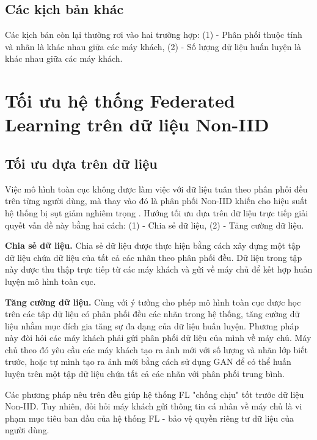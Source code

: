 \subsection{Các kịch bản khác}

Các kịch bản còn lại thường rơi vào hai trường hợp: (1) - Phân phối thuộc tính và nhãn là khác nhau giữa các máy khách, (2) - Số lượng dữ liệu huấn luyện là khác nhau giữa các máy khách.

\section{Tối ưu hệ thống Federated Learning trên dữ liệu Non-IID}

\subsection{Tối ưu dựa trên dữ liệu}

Việc mô hình toàn cục không được làm việc với dữ liệu tuân theo phân phối đều trên từng người dùng, mà thay vào đó là phân phối Non-IID khiến cho hiệu suất hệ thống bị sụt giảm nghiêm trọng \cite{zhao2018federated}. Hướng tối ưu dựa trên dữ liệu trực tiếp giải quyết vấn đề này bằng hai cách: (1) - Chia sẻ dữ liệu, (2) - Tăng cường dữ liệu.

\textbf{Chia sẻ dữ liệu.} Chia sẻ dữ liệu \cite{zhu2021federated} được thực hiện bằng cách xây dựng một tập dữ liệu chứa dữ liệu của tất cả các nhãn theo phân phối đều. Dữ liệu trong tập này được thu thập trực tiếp từ các máy khách và gửi về máy chủ để kết hợp huấn luyện mô hình toàn cục.

\textbf{Tăng cường dữ liệu.} Cùng với ý tưởng cho phép mô hình toàn cục được học trên các tập dữ liệu có phân phối đều các nhãn trong hệ thống, tăng cường dữ liệu \cite{tanner1987calculation} nhằm mục đích gia tăng sự đa dạng của dữ liệu huấn luyện. Phương pháp này đòi hỏi các máy khách phải gửi phân phối dữ liệu của mình về máy chủ. Máy chủ theo đó yêu cầu các máy khách tạo ra ảnh mới \cite{duan2019astraea} với số lượng và nhãn lớp biết trước, hoặc tự mình tạo ra ảnh mới bằng cách sử dụng GAN \cite{zhu2021federated} để có thể huấn luyện trên một tập dữ liệu chứa tất cả các nhãn với phân phối trung bình.

Các phương pháp nêu trên đều giúp hệ thống FL "chống chịu" tốt trước dữ liệu Non-IID. Tuy nhiên, đỏi hỏi máy khách gửi thông tin cá nhân về máy chủ là vi phạm mục tiêu ban đầu của hệ thống FL - bảo vệ quyền riêng tư dữ liệu của người dùng.

